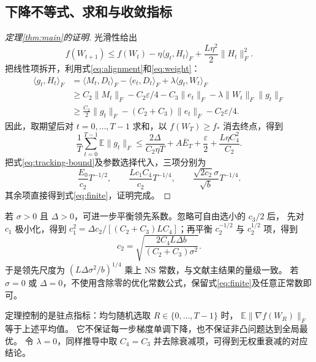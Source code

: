\subsection{下降不等式、求和与收敛指标}
\begin{proof}[定理\ref{thm:main}的证明]
光滑性给出
\[
 f(W_{t+1})\le f(W_t)-\eta\langle g_t,H_t\rangle_F
 +\frac{L\eta^2}{2}\|H_t\|_F^2.
\]
把线性项拆开，利用式\eqref{eq:alignment}和\eqref{eq:weight}：
\begin{align}
 \langle g_t,H_t\rangle_F
 &=\langle M_t,D_t\rangle_F-\langle e_t,D_t\rangle_F
   +\lambda\langle g_t,W_t\rangle_F\\
 &\ge C_2\|M_t\|_F-C_2\varepsilon/4-C_3\|e_t\|_F
   -\lambda\|W_t\|_F\|g_t\|_F\\
 &\ge\frac{C_2}{2}\|g_t\|_F-(C_2+C_3)\|e_t\|_F-C_2\varepsilon/4.
\end{align}
因此，取期望后对 $t=0,\ldots,T-1$ 求和，以 $f(W_T)\ge f_*$ 消去终点，得到
\begin{equation}\label{eq:pre-rate}
 \frac1T\sum_{t=0}^{T-1}\mathbb E\|g_t\|_F
 \le\frac{2\Delta}{C_2\eta T}+A\overline E_T
 +\frac\varepsilon2+\frac{L\eta C_4^2}{C_2}.
\end{equation}
把式\eqref{eq:tracking-bound}及参数选择代入，三项分别为
\[
 \frac{E_0}{c_2}T^{-1/2},\qquad
 \frac{Lc_1C_4}{c_2}T^{-1/4},\qquad
 \frac{\sqrt{2c_2}\sigma}{\sqrt b}T^{-1/4}.
\]
其余项直接得到式\eqref{eq:finite}，证明完成。
\end{proof}

若 $\sigma>0$ 且 $\Delta>0$，可进一步平衡领先系数。忽略可自由选小的 $c_3/2$ 后，
先对 $c_1$ 极小化，得到
$c_1^2=\Delta c_2/[(C_2+C_3)LC_4]$；再平衡 $c_2^{-1/2}$ 与 $c_2^{1/2}$ 项，得到
\[
 c_2=\sqrt{\frac{2C_4L\Delta b}{(C_2+C_3)\sigma^2}}.
\]
于是领先尺度为 $(L\Delta\sigma^2/b)^{1/4}$ 乘上 NS 常数，与文献主结果的量级一致。
若 $\sigma=0$ 或 $\Delta=0$，不使用含除零的优化常数公式，保留式\eqref{eq:finite}及任意正常数即可。

定理控制的是驻点指标：均匀随机选取 $R\in\{0,\ldots,T-1\}$ 时，
$\mathbb E\|\nabla f(W_R)\|_F$ 等于上述平均值。
它不保证每一步梯度单调下降，也不保证非凸问题达到全局最优。
令 $\lambda=0$，同样推导中取 $C_4=C_3$ 并去除衰减项，可得到无权重衰减的对应结论。
